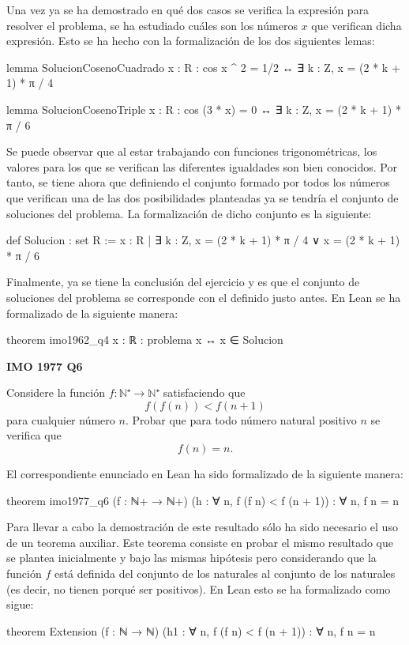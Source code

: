 Una vez ya se ha demostrado en qué dos casos se verifica la expresión
para resolver el problema, se ha estudiado cuáles son los números \(x\)
que verifican dicha expresión. Esto se ha hecho con la formalización de
los dos siguientes lemas:
\begin{leancode}
lemma SolucionCosenoCuadrado
  {x : R}
  : cos x ^ 2 = 1/2 ↔ ∃ k : Z, x = (2 * k + 1) * π / 4

lemma SolucionCosenoTriple
  {x : R}
  : cos (3 * x) = 0 ↔ ∃ k : Z, x = (2 * k + 1) * π / 6
\end{leancode}

Se puede observar que al estar trabajando con funciones trigonométricas,
los valores para los que se verifican las diferentes igualdades son bien
conocidos.  Por tanto, se tiene ahora que definiendo el conjunto formado
por todos los números que verifican una de las dos posibilidades
planteadas ya se tendría el conjunto de soluciones del problema. La
formalización de dicho conjunto es la siguiente:
\begin{leancode}
def Solucion : set R :=
  {x : R | ∃ k : Z, x = (2 * k + 1) * π / 4 ∨ x = (2 * k + 1) * π / 6}
\end{leancode}

Finalmente, ya se tiene la conclusión del ejercicio y es que el conjunto
de soluciones del problema se corresponde con el definido justo
antes. En Lean se ha formalizado de la siguiente manera:

\begin{leancode}
theorem imo1962_q4
  {x : ℝ}
  : problema x ↔ x ∈ Solucion
\end{leancode}

\textbf{IMO 1977 Q6}

\noindent
Considere la función
\(f:ℕ⁺ → ℕ⁺\) satisfaciendo que
\[f(f(n)) < f(n+1)\]
para cualquier número \(n\). Probar que para todo número
natural positivo \(n\) se verifica que
\[f(n) = n.\]

El correspondiente enunciado en Lean ha sido formalizado de la siguiente
manera:
\begin{leancode}
theorem imo1977_q6
  (f : ℕ+ → ℕ+)
  (h : ∀ n, f (f n) < f (n + 1))
  : ∀ n, f n = n
\end{leancode}

Para llevar a cabo la demostración de este resultado sólo ha sido
necesario el uso de un teorema auxiliar. Este teorema consiste en probar
el mismo resultado que se plantea inicialmente y bajo las mismas
hipótesis pero considerando que la función \(f\) está definida del
conjunto de los naturales al conjunto de los naturales (es decir, no
tienen porqué ser positivos). En Lean esto se ha formalizado como sigue:
\begin{leancode}
theorem Extension
  (f : ℕ → ℕ)
  (h1 : ∀ n, f (f n) < f (n + 1))
  : ∀ n, f n = n
\end{leancode}

